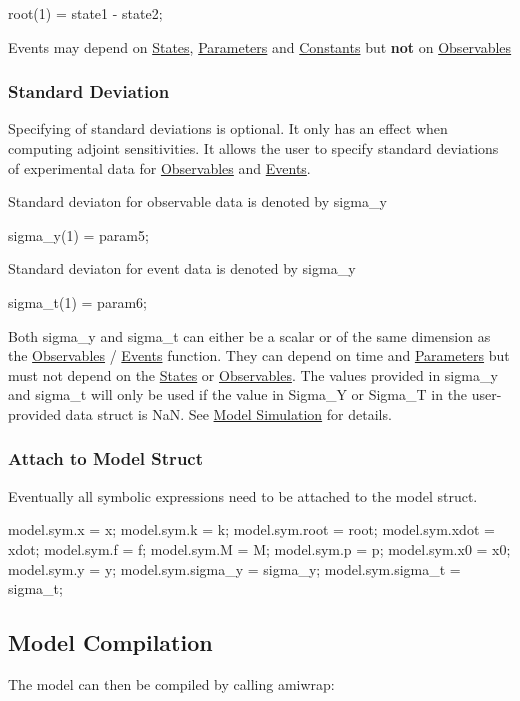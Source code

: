 \begin{DoxyCode}
root(1) = state1 - state2; 
\end{DoxyCode}


Events may depend on \hyperlink{def_simu_states}{States}, \hyperlink{def_simu_parameters}{Parameters} and \hyperlink{def_simu_constants}{Constants} but {\bfseries not} on \hyperlink{def_simu_observables}{Observables}\hypertarget{def_simu_std}{}\subsubsection{Standard Deviation}\label{def_simu_std}
Specifying of standard deviations is optional. It only has an effect when computing adjoint sensitivities. It allows the user to specify standard deviations of experimental data for \hyperlink{def_simu_observables}{Observables} and \hyperlink{def_simu_events}{Events}.

Standard deviaton for observable data is denoted by sigma\+\_\+y


\begin{DoxyCode}
sigma\_y(1) = param5; 
\end{DoxyCode}


Standard deviaton for event data is denoted by sigma\+\_\+y


\begin{DoxyCode}
sigma\_t(1) = param6; 
\end{DoxyCode}


Both sigma\+\_\+y and sigma\+\_\+t can either be a scalar or of the same dimension as the \hyperlink{def_simu_observables}{Observables} / \hyperlink{def_simu_events}{Events} function. They can depend on time and \hyperlink{def_simu_parameters}{Parameters} but must not depend on the \hyperlink{def_simu_states}{States} or \hyperlink{def_simu_observables}{Observables}. The values provided in sigma\+\_\+y and sigma\+\_\+t will only be used if the value in Sigma\+\_\+\+Y or Sigma\+\_\+\+T in the user-\/provided data struct is Na\+N. See \hyperlink{def_simu_simulation}{Model Simulation} for details.\hypertarget{def_simu_attach}{}\subsubsection{Attach to Model Struct}\label{def_simu_attach}
Eventually all symbolic expressions need to be attached to the model struct.


\begin{DoxyCode}
model.sym.x = x;
model.sym.k = k;
model.sym.root = root;
model.sym.xdot = xdot;
model.sym.f = f;
model.sym.M = M; %
model.sym.p = p;
model.sym.x0 = x0;
model.sym.y = y;
model.sym.sigma\_y = sigma\_y;
model.sym.sigma\_t = sigma\_t;
\end{DoxyCode}
\hypertarget{def_simu_compilation}{}\subsection{Model Compilation}\label{def_simu_compilation}
The model can then be compiled by calling amiwrap\+:



